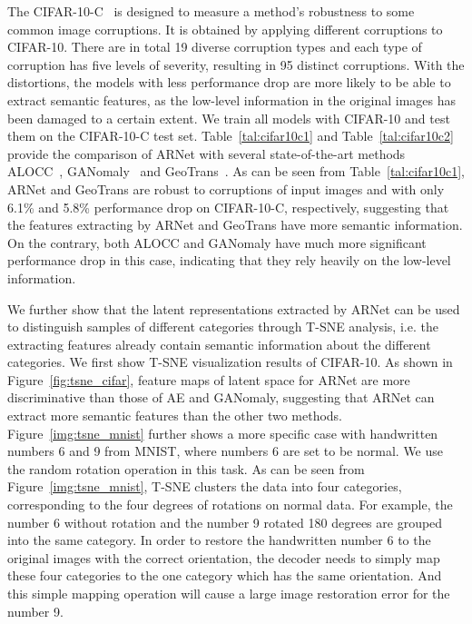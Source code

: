 \documentclass[journal]{IEEEtran}
\begin{document}
The CIFAR-10-C~\cite{hendrycks2018benchmarking} is designed to measure a method's robustness to some common image corruptions. It is obtained by applying different corruptions to CIFAR-10. There are in total 19 diverse corruption types and each type of corruption has five levels of severity, resulting in 95 distinct corruptions. With the distortions, the models with less performance drop are more likely to be able to extract semantic features, as the low-level information in the original images has been damaged to a certain extent. We train all models with CIFAR-10 and test them on the CIFAR-10-C test set. Table~\ref{tal:cifar10c1} and Table~\ref{tal:cifar10c2} provide the comparison of ARNet with several state-of-the-art methods ALOCC~\cite{Sabokrou2018Adversarially}, GANomaly~\cite{akccay2019skip} and GeoTrans~\cite{golan2018deep}. As can be seen from Table~\ref{tal:cifar10c1}, ARNet and GeoTrans are robust to corruptions of input images and with only 6.1\% and 5.8\% performance drop on CIFAR-10-C, respectively, suggesting that the features extracting by ARNet and GeoTrans have more semantic information. On the contrary, both ALOCC and GANomaly have much more significant performance drop in this case, indicating that they rely heavily on the low-level information.

We further show that the latent representations extracted by ARNet can be used to distinguish samples of different categories through T-SNE analysis, i.e. the extracting features already contain semantic information about the different categories. We first show T-SNE visualization results of CIFAR-10. As shown in Figure~\ref{fig:tsne_cifar}, feature maps of latent space for ARNet are more discriminative than those of AE and GANomaly, suggesting that ARNet can extract more semantic features than the other two methods. Figure~\ref{img:tsne_mnist} further shows a more specific case with handwritten numbers 6 and 9 from MNIST,  where numbers 6 are set to be normal. We use the random rotation operation in this task. As can be seen from Figure~\ref{img:tsne_mnist}, T-SNE clusters the data into four categories, corresponding to the four degrees of rotations on normal data. For example, the number 6 without rotation and the number 9 rotated 180 degrees are grouped into the same category. In order to restore the handwritten number 6 to the original images with the correct orientation, the decoder needs to simply map these four categories to the one category which has the same orientation. And this simple mapping operation will cause a large image restoration error for the number 9. 
\end{document}
